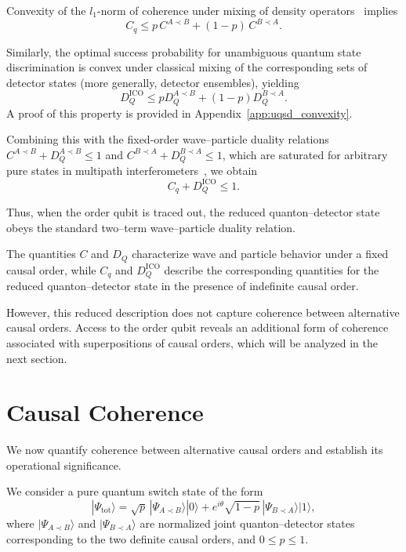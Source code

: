 \documentclass[aps,pra,reprint,superscriptaddress]{revtex4-2}
\begin{document}
Convexity of the $l_1$-norm of coherence under mixing of density operators~\cite{Baumgratz2014} implies
\begin{equation}
C_q
\le
p\,C^{A\prec B}
+
(1-p)\,C^{B\prec A}.
\end{equation}

Similarly, the optimal success probability for unambiguous
quantum state discrimination is convex under classical mixing
of the corresponding sets of detector states (more generally,
detector ensembles), yielding
\begin{equation}
D_Q^{\mathrm{ICO}} \le
p D_Q^{A\prec B}
+
(1-p) D_Q^{B\prec A}.
\end{equation}
A proof of this property is provided in
Appendix~\ref{app:uqsd_convexity}.

Combining this with the fixed-order wave--particle duality
relations $C^{A\prec B}+D_Q^{A\prec B}\le 1$ and
$C^{B\prec A}+D_Q^{B\prec A}\le 1$, which are saturated for
arbitrary pure states in multipath interferometers~\cite{Bera2015},
we obtain
\begin{equation}
C_q + D_Q^{\mathrm{ICO}} \le 1 .
\end{equation}

Thus, when the order qubit is traced out, the reduced
quanton--detector state obeys the standard two--term
wave--particle duality relation.

The quantities $C$ and $D_Q$ characterize wave and particle behavior under a fixed causal order, while $C_q$ and $D_Q^{\mathrm{ICO}}$ describe the corresponding quantities for the reduced quanton--detector state in the presence of indefinite causal order.

However, this reduced description does not capture coherence
between alternative causal orders. Access to the order qubit
reveals an additional form of coherence associated with
superpositions of causal orders, which will be analyzed in
the next section.
\section{Causal Coherence}\label{sec:causal}
We now quantify coherence between alternative causal orders
and establish its operational significance.

We consider a pure quantum switch state of the form
\begin{equation}
|\Psi_{\mathrm{tot}}\rangle =
\sqrt{p}\,|\Psi_{A\prec B}\rangle|0\rangle
+ e^{i\theta}\sqrt{1-p}\,|\Psi_{B\prec A}\rangle|1\rangle,
\label{eq:switch_state}
\end{equation}
where $|\Psi_{A\prec B}\rangle$ and 
$|\Psi_{B\prec A}\rangle$ are normalized joint
quanton--detector states corresponding to the two definite
causal orders, and $0 \le p \le 1$.
\end{document}
